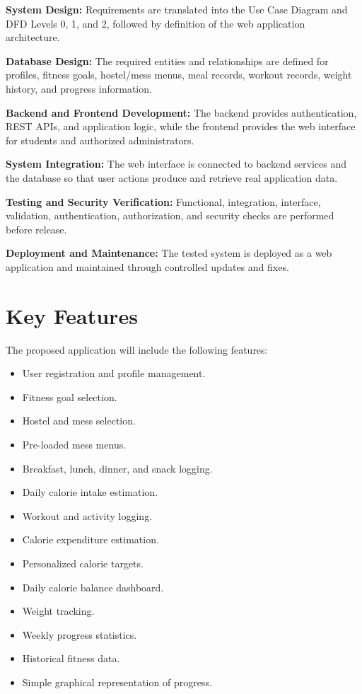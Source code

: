 \documentclass[11pt,a4paper]{article}
\begin{document}
\textbf{System Design:} Requirements are translated into the Use Case Diagram and DFD Levels 0, 1, and 2, followed by definition of the web application architecture.

\textbf{Database Design:} The required entities and relationships are defined for profiles, fitness goals, hostel/mess menus, meal records, workout records, weight history, and progress information.

\textbf{Backend and Frontend Development:} The backend provides authentication, REST APIs, and application logic, while the frontend provides the web interface for students and authorized administrators.

\textbf{System Integration:} The web interface is connected to backend services and the database so that user actions produce and retrieve real application data.

\textbf{Testing and Security Verification:} Functional, integration, interface, validation, authentication, authorization, and security checks are performed before release.

\textbf{Deployment and Maintenance:} The tested system is deployed as a web application and maintained through controlled updates and fixes.

\section{Key Features}

The proposed application will include the following features:
\begin{itemize}
    \item User registration and profile management.
    \item Fitness goal selection.
    \item Hostel and mess selection.
    \item Pre-loaded mess menus.
    \item Breakfast, lunch, dinner, and snack logging.
    \item Daily calorie intake estimation.
    \item Workout and activity logging.
    \item Calorie expenditure estimation.
    \item Personalized calorie targets.
    \item Daily calorie balance dashboard.
    \item Weight tracking.
    \item Weekly progress statistics.
    \item Historical fitness data.
    \item Simple graphical representation of progress.
\end{itemize}
\end{document}
